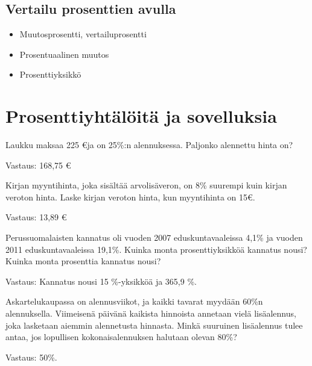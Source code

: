 \section{Vertailu prosenttien avulla}

\begin{itemize}
	\item Muutosprosentti, vertailuprosentti
	\item Prosentuaalinen muutos
	\item Prosenttiyksikkö
\end{itemize}

\chapter{Prosenttiyhtälöitä ja sovelluksia}

\begin{tehtava}
    Laukku maksaa 225 \euro ja on 25\%:n alennuksessa. Paljonko alennettu hinta on?
    
    \begin{vastaus}
    Vastaus: 168,75 \euro
    \end{vastaus}
\end{tehtava}

\begin{tehtava}
    Kirjan myyntihinta, joka sisältää arvolisäveron, on 8\% suurempi kuin kirjan
    veroton hinta. Laske kirjan veroton hinta, kun myyntihinta on 15\euro.
    
    \begin{vastaus}
        Vastaus: 13,89 \euro
    \end{vastaus}
\end{tehtava}

\begin{tehtava}
    Perussuomalaisten kannatus oli vuoden 2007 eduskuntavaaleissa 4,1\% ja
    vuoden 2011 eduskuntavaaleissa 19,1\%. Kuinka monta prosenttiyksikköä kannatus nousi? Kuinka monta prosenttia kannatus nousi?
    \begin{vastaus}
    Vastaus: Kannatus nousi 15 \%-yksikköä ja 365,9 \%.
    \end{vastaus}
\end{tehtava}

\begin{tehtava}
    Askartelukaupassa on alennusviikot, ja kaikki tavarat myydään 60\%n alennuksella. Viimeisenä päivänä kaikista hinnoista annetaan 
    vielä lisäalennus, joka lasketaan aiemmin alennetusta hinnasta. Minkä suuruinen lisäalennus tulee antaa, jos lopullisen 
    kokonaisalennuksen halutaan olevan 80\%?

    \begin{vastaus}
        Vastaus: 50\%.
    \end{vastaus}
\end{tehtava}

